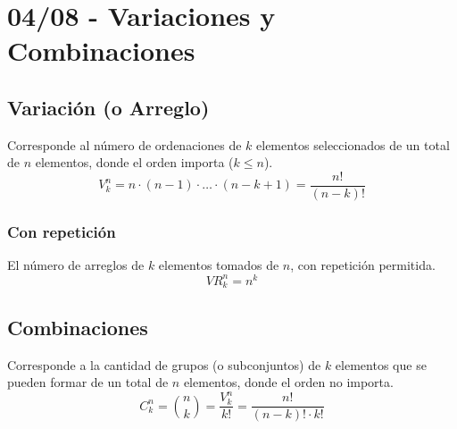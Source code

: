 \documentclass[12pt, letterpaper]{article}
\begin{document}
\section{04/08 - Variaciones y Combinaciones}
\subsection{Variación (o Arreglo)}
Corresponde al número de ordenaciones de $k$ elementos seleccionados de un total de $n$ elementos, donde el orden importa ($k \le n$).
\[V_k^n = n \cdot (n - 1) \cdot \dots \cdot (n - k + 1) = \frac{n!}{(n - k)!} \]
\subsubsection*{Con repetición}
El número de arreglos de $k$ elementos tomados de $n$, con repetición permitida.
\[VR_k^n = n^k \]

\subsection{Combinaciones} Corresponde a la cantidad de grupos (o subconjuntos) de $k$ elementos que se pueden formar de un total de $n$ elementos, donde el orden no importa.
\[C_k^n = \binom{n}{k} = \frac{V_k^n}{k!} = \frac{n!}{(n - k)! \cdot k!} \]
\end{document}
